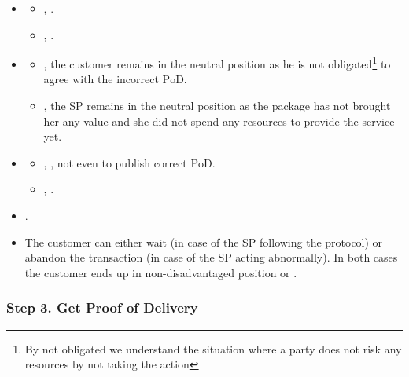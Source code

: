 \documentclass[pdftex,twocolumn,epjc3]{svjour3}
\begin{document}
{\begin{itemize}
  \item \DisputePath
    \begin{itemize}
      \item {}, \CustomerLosesBeforePayment{}.
      \item {}, .
    \end{itemize}
\end{itemize}

\ActedAbnormallyThen{\sp}

\begin{itemize}
\item \AgreeablePath
  \begin{itemize}
    \item {}, the customer remains in the neutral position as he is not obligated\footnote{By not obligated we understand the situation where a party does not risk any resources by not taking the action} to agree with the incorrect $\mathrm{PoD}$.
    \item {}, the SP remains in the neutral position as the package has not brought her any value and she did not spend any resources to provide the service yet.
  \end{itemize}
\item \DisputePath
  \begin{itemize}
    \item {}, \CustomerLosesBeforePayment{}, not even to publish correct $\mathrm{PoD}$.
    \item {}, .
  \end{itemize}
\end{itemize}

\Fairness

\begin{itemize}
  \item {}.
  \item The customer can either wait (in case of the SP following the protocol) or abandon the transaction (in case of the SP acting abnormally). In both cases the customer ends up in non-disadvantaged position  or .
\end{itemize}


\subsubsection*{Step 3. \CustomerTurn{} Get Proof of Delivery}\label{step-3-get-proof-of-delivery}

}
\end{document}
